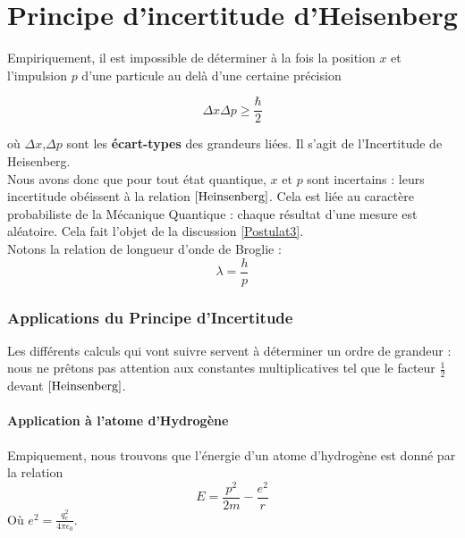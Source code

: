 \documentclass[../Notes de cours]{subfiles}
\begin{document}
\part{Principe d'incertitude d'Heisenberg}
Empiriquement, il est impossible de déterminer à la fois la position $x$ et l'impulsion $p$ d'une particule au delà d'une certaine précision

\begin{equation}
\label{Heinsenberg}
\Delta x \Delta p \geq \frac{\hbar}{2}
\end{equation}

où $\Delta x$,$\Delta p$ sont les \textbf{écart-types} des grandeurs liées. Il s'agit de l'Incertitude de Heisenberg.\\

Nous avons donc que pour tout état quantique, $x$ et $p$ sont incertains : leurs incertitude obéissent à la relation $\ref{Heinsenberg}$. Cela est liée au caractère probabiliste de la Mécanique Quantique : chaque résultat d'une mesure est aléatoire. Cela fait l'objet de la discussion \ref{Postulat3}.\\

Notons la relation de longueur d'onde de Broglie : 
\begin{equation}
\label{Broglie}
\lambda = \frac{h}{p}
\end{equation}

\section{Applications du Principe d'Incertitude}
Les différents calculs qui vont suivre servent à déterminer un ordre de grandeur : nous ne prêtons pas attention aux constantes multiplicatives tel que le facteur $\frac{1}{2}$ devant $\ref{Heinsenberg}$.
\subsection{Application à l'atome d'Hydrogène}
Empiquement, nous trouvons que l'énergie d'un atome d'hydrogène est donné par la relation
\begin{equation}
\label{Energie hydrogène}
E = \frac{p^2}{2m} - \frac{e^2}{r}
\end{equation}
Où $e^2 = \frac{q_e^2}{4 \pi \epsilon_0}$.\\
\end{document}
